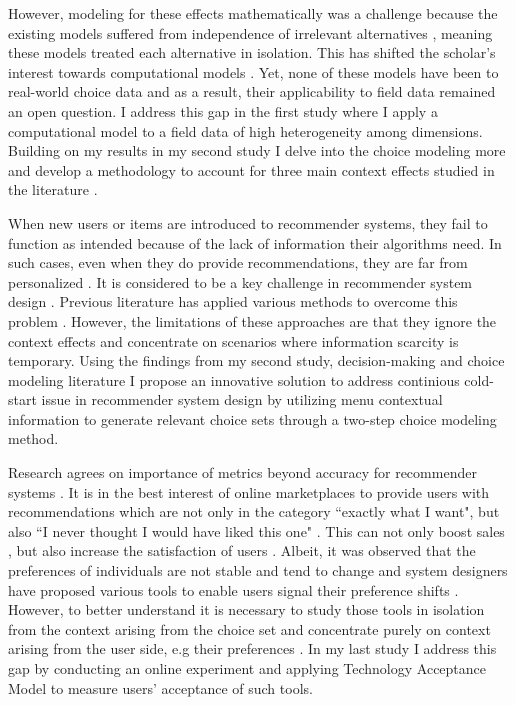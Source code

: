 \documentclass[a4paper,12pt]{article}
\begin{document}
However, modeling for these effects mathematically was a challenge because the existing models suffered from independence of irrelevant alternatives \citep{luce59}, meaning these models treated each alternative in isolation. This has shifted the scholar's interest towards computational models \citep{usher2001time, roe2001multialternative, trueblood2014multiattribute, noguchi2018multialternative}. Yet, none of these models have been to real-world choice data and as a result, their applicability to field data remained an open question. I address this gap in the first study where I apply a computational model to a field data of high heterogeneity among dimensions. Building on my results in my second study I delve into the choice modeling more and develop a methodology to account for three main context effects studied in the literature \citep{truebloodEtAl13}. 

When new users or items are introduced to recommender systems, they fail to function as intended because of the lack of information their algorithms need. In such cases, even when they do provide recommendations, they are far from personalized \citep{lika2014facing}. It is considered to be a key challenge in recommender system design \citep{park2009pairwise}. Previous literature has applied various methods to overcome this problem \citep{guy2009personalized, aharon2013off, bykau2013coping, saveski2014item}. However, the limitations of these approaches are that they ignore the context effects and concentrate on scenarios where information scarcity is temporary. Using the findings from my second study, decision-making and choice modeling literature I propose an innovative solution to address continious cold-start issue in recommender system design by utilizing menu contextual information to generate relevant choice sets through a two-step choice modeling method. 

Research agrees on importance of metrics beyond accuracy for recommender systems \citep{kaminskas2016diversity}. It is in the best interest of online marketplaces to provide users with recommendations which are not only in the category ``exactly what I want", but also ``I never thought I would have liked this one" \citep{kotkovSurveySerendipityRecommender2016}. This can not only boost sales \citep{songWhenHowDiversify2019}, but also increase the satisfaction of users \citep{knijnenburgExplainingUserExperience2012}. Albeit, it was observed that the preferences of individuals are not stable and tend to change and system designers have proposed various tools to enable users signal their preference shifts \citep{bostandjiev2012tasteweights,hijikata2012relation}. However, to better understand it is necessary to study those tools in isolation from the context arising from the choice set and concentrate purely on context arising from the user side, e.g their preferences \citep{adomavicius2011context}. In my last study I address this gap by conducting an online experiment and applying Technology Acceptance Model \citep{davis1985technology} to measure users' acceptance of such tools.
\end{document}

